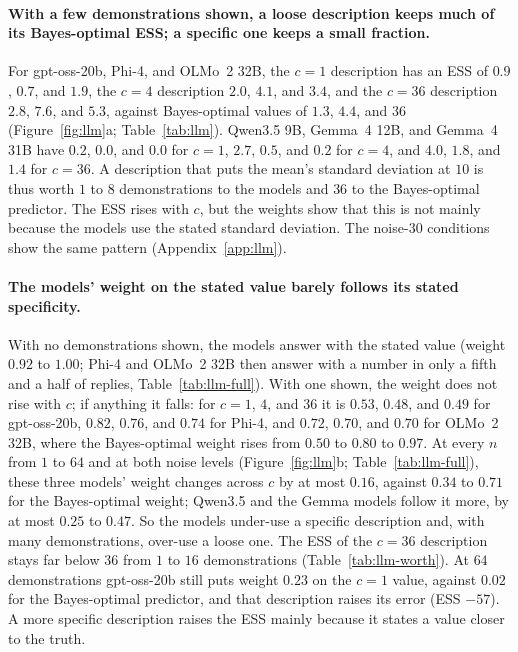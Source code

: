 \documentclass{article}
\begin{document}
\paragraph{With a few demonstrations shown, a loose description keeps much of its Bayes-optimal ESS; a specific one keeps a small fraction.} For gpt-oss-20b, Phi-4, and OLMo~2 32B, the $c = 1$ description has an ESS of $0.9$, $0.7$, and $1.9$, the $c = 4$ description $2.0$, $4.1$, and $3.4$, and the $c = 36$ description $2.8$, $7.6$, and $5.3$, against Bayes-optimal values of $1.3$, $4.4$, and $36$ (Figure~\ref{fig:llm}a; Table~\ref{tab:llm}). Qwen3.5 9B, Gemma~4 12B, and Gemma~4 31B have $0.2$, $0.0$, and $0.0$ for $c = 1$, $2.7$, $0.5$, and $0.2$ for $c = 4$, and $4.0$, $1.8$, and $1.4$ for $c = 36$. A description that puts the mean's standard deviation at $10$ is thus worth $1$ to $8$ demonstrations to the models and $36$ to the Bayes-optimal predictor. The ESS rises with $c$, but the weights show that this is not mainly because the models use the stated standard deviation. The noise-$30$ conditions show the same pattern (Appendix~\ref{app:llm}).

\paragraph{The models' weight on the stated value barely follows its stated specificity.} With no demonstrations shown, the models answer with the stated value (weight $0.92$ to $1.00$; Phi-4 and OLMo~2 32B then answer with a number in only a fifth and a half of replies, Table~\ref{tab:llm-full}). With one shown, the weight does not rise with $c$; if anything it falls: for $c = 1$, $4$, and $36$ it is $0.53$, $0.48$, and $0.49$ for gpt-oss-20b, $0.82$, $0.76$, and $0.74$ for Phi-4, and $0.72$, $0.70$, and $0.70$ for OLMo~2 32B, where the Bayes-optimal weight rises from $0.50$ to $0.80$ to $0.97$. At every $n$ from $1$ to $64$ and at both noise levels (Figure~\ref{fig:llm}b; Table~\ref{tab:llm-full}), these three models' weight changes across $c$ by at most $0.16$, against $0.34$ to $0.71$ for the Bayes-optimal weight; Qwen3.5 and the Gemma models follow it more, by at most $0.25$ to $0.47$. So the models under-use a specific description and, with many demonstrations, over-use a loose one. The ESS of the $c = 36$ description stays far below $36$ from $1$ to $16$ demonstrations (Table~\ref{tab:llm-worth}). At $64$ demonstrations gpt-oss-20b still puts weight $0.23$ on the $c = 1$ value, against $0.02$ for the Bayes-optimal predictor, and that description raises its error (ESS $-57$). A more specific description raises the ESS mainly because it states a value closer to the truth.
\end{document}
